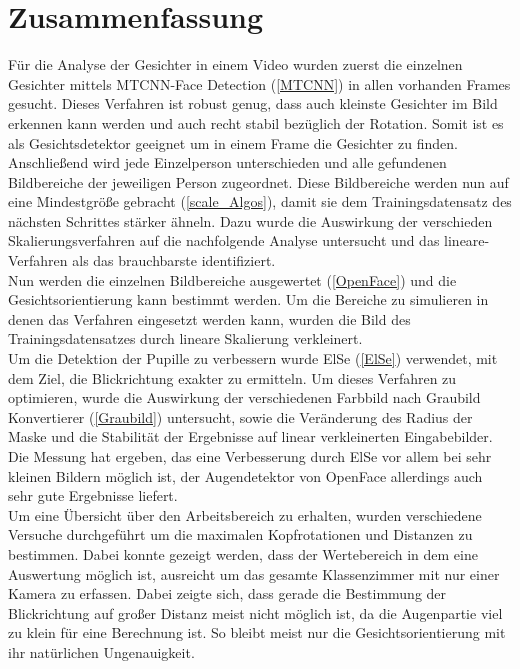 \section{Zusammenfassung}
Für die Analyse der Gesichter in einem Video wurden zuerst die einzelnen Gesichter mittels MTCNN-Face Detection (\autoref{MTCNN}) in allen vorhanden Frames gesucht. Dieses Verfahren ist robust genug, dass auch kleinste Gesichter im Bild erkennen kann werden und auch recht stabil bezüglich der Rotation. Somit ist es als Gesichtsdetektor geeignet um in einem Frame die Gesichter zu finden.\\
Anschließend wird jede Einzelperson unterschieden und alle gefundenen Bildbereiche der jeweiligen Person zugeordnet. Diese Bildbereiche werden nun auf eine Mindestgröße gebracht (\autoref{scale_Algos}), damit sie dem Trainingsdatensatz des nächsten Schrittes stärker ähneln. Dazu wurde die Auswirkung der verschieden Skalierungsverfahren auf die nachfolgende Analyse untersucht und das lineare-Verfahren als das brauchbarste identifiziert.\\
Nun werden die einzelnen Bildbereiche ausgewertet (\autoref{OpenFace}) und die Gesichtsorientierung kann bestimmt werden. Um die Bereiche zu simulieren in denen das Verfahren eingesetzt werden kann, wurden die Bild des Trainingsdatensatzes durch lineare Skalierung verkleinert.\\
Um die Detektion der Pupille zu verbessern wurde ElSe (\autoref{ElSe}) verwendet, mit dem Ziel, die Blickrichtung exakter zu ermitteln. Um dieses Verfahren zu optimieren, wurde die Auswirkung der verschiedenen Farbbild nach Graubild Konvertierer (\autoref{Graubild}) untersucht, sowie die Veränderung des Radius der Maske und die Stabilität der Ergebnisse auf linear verkleinerten Eingabebilder. Die Messung hat ergeben, das eine Verbesserung durch ElSe vor allem bei sehr kleinen Bildern möglich ist, der Augendetektor von OpenFace allerdings auch sehr gute Ergebnisse liefert.\\
Um eine Übersicht über den Arbeitsbereich zu erhalten, wurden verschiedene Versuche durchgeführt um die maximalen Kopfrotationen und Distanzen zu bestimmen. Dabei konnte gezeigt werden, dass der Wertebereich in dem eine Auswertung möglich ist, ausreicht um das gesamte Klassenzimmer mit nur einer Kamera zu erfassen. Dabei zeigte sich, dass gerade die Bestimmung der Blickrichtung auf großer Distanz meist nicht möglich ist, da die Augenpartie viel zu klein für eine Berechnung ist. So bleibt meist nur die Gesichtsorientierung mit ihr natürlichen Ungenauigkeit.\\
